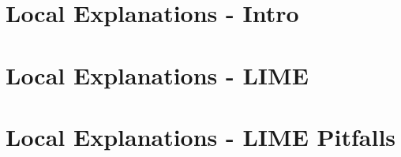 \documentclass[11pt,compress,t,notes=noshow, aspectratio=169, xcolor=table]{beamer}
\begin{document}


\section{Local Explanations - Intro}


\section{Local Explanations - LIME}


\section{Local Explanations - LIME Pitfalls}

\end{document}
